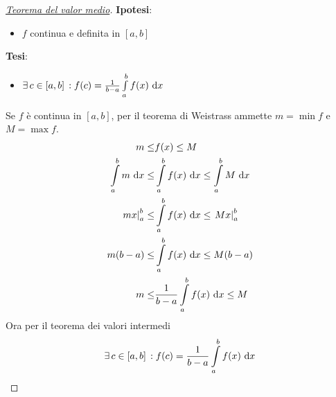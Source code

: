   \begin{proof}
    [\protect\hyperlink{teor:media}{Teorema del valor medio}]
    \textbf{Ipotesi}:
    \begin{itemize}
      \item $f$ continua e definita in $[a,b]$
    \end{itemize}
    \textbf{Tesi}:
    \begin{itemize}
      \item $\exists\,c\in[a,b]\,: f(c)=\frac{1}{b-a}\int\limits_{a}^{b} f(x)\,\mathop{}\!\mathrm{d} x$
    \end{itemize}
    \divisor

    Se $f$ è continua in $[a,b]$, per il teorema di Weistrass ammette $m=\min f$ e $M=\max f$.
    \begin{align*}
      m\leq &f(x) \leq M\\
      \int\limits_{a}^{b} m\,\mathop{}\!\mathrm{d} x\leq
      &\int\limits_{a}^{b}f(x)\,\mathop{}\!\mathrm{d} x\leq\int\limits_{a}^{b}M\,\mathop{}\!\mathrm{d} x\\
      \left.mx\right|_a^b\leq &\int\limits_{a}^{b} f(x)\,\mathop{}\!\mathrm{d} x\leq \left.Mx\right|_a^b\\
          m(b-a)\leq &\int\limits_{a}^{b} f(x)\,\mathop{}\!\mathrm{d} x\leq M(b-a)\\
          m\leq &\frac{1}{b-a}\int\limits_{a}^{b} f(x)\,\mathop{}\!\mathrm{d} x\leq M
        \end{align*}
        Ora per il teorema dei valori intermedi
        \begin{equation*}
          \exists\,c\in[a,b]\,: f(c)=\frac{1}{b-a}\int\limits_{a}^{b} f(x)\,\mathop{}\!\mathrm{d} x
        \end{equation*}
      \end{proof}

